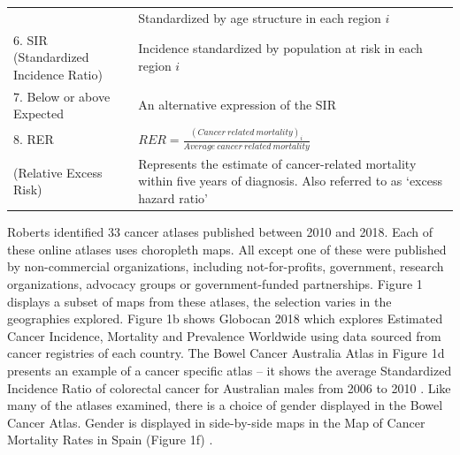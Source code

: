 \documentclass{monashthesis}
\begin{document}
\begin{longtable}[]{@{}ll@{}}
\begin{minipage}[t]{0.28\columnwidth}
\end{minipage} & \begin{minipage}[t]{0.66\columnwidth}\raggedright
Standardized by age structure in each region \(i\)\strut
\end{minipage}\tabularnewline
\begin{minipage}[t]{0.28\columnwidth}\raggedright
6. SIR (Standardized Incidence Ratio)\strut
\end{minipage} & \begin{minipage}[t]{0.66\columnwidth}\raggedright
Incidence standardized by population at risk in each region \(i\)\strut
\end{minipage}\tabularnewline
\begin{minipage}[t]{0.28\columnwidth}\raggedright
7. Below or above Expected\strut
\end{minipage} & \begin{minipage}[t]{0.66\columnwidth}\raggedright
An alternative expression of the SIR\strut
\end{minipage}\tabularnewline
\begin{minipage}[t]{0.28\columnwidth}\raggedright
8. RER\strut
\end{minipage} & \begin{minipage}[t]{0.66\columnwidth}\raggedright
\(RER = \frac{(Cancer\ related\ mortality)_i}{Average\ cancer\ related\ mortality}\)\strut
\end{minipage}\tabularnewline
\begin{minipage}[t]{0.28\columnwidth}\raggedright
(Relative Excess Risk)\strut
\end{minipage} & \begin{minipage}[t]{0.66\columnwidth}\raggedright
Represents the estimate of cancer-related mortality within five years of diagnosis. Also referred to as `excess hazard ratio'\strut
\end{minipage}\tabularnewline
\bottomrule
\end{longtable}

Roberts \autocite{roberts2019communication} identified 33 cancer atlases published between 2010 and 2018. Each of these online atlases uses choropleth maps. All except one of these were published by non-commercial organizations, including not-for-profits, government, research organizations, advocacy groups or government-funded partnerships. Figure 1 displays a subset of maps from these atlases, the selection varies in the geographies explored. Figure 1b shows Globocan 2018 \autocite{Globocan} which explores Estimated Cancer Incidence, Mortality and Prevalence Worldwide using data sourced from cancer registries of each country. The Bowel Cancer Australia Atlas in Figure 1d presents an example of a cancer specific atlas -- it shows the average Standardized Incidence Ratio of colorectal cancer for Australian males from 2006 to 2010 \autocite{Bowel}. Like many of the atlases examined, there is a choice of gender displayed in the Bowel Cancer Atlas. Gender is displayed in side-by-side maps in the Map of Cancer Mortality Rates in Spain (Figure 1f) \autocite{cancerSpain}.
\end{document}
